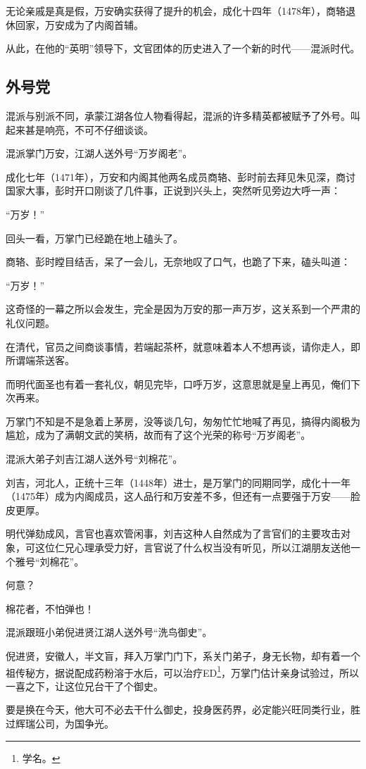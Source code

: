 \begin{multicols}{\theparacolNo}
无论亲戚是真是假，万安确实获得了提升的机会，成化十四年（1478年），商辂退休回家，万安成为了内阁首辅。

从此，在他的“英明”领导下，文官团体的历史进入了一个新的时代——混派时代。

\subsection{外号党}
混派与别派不同，承蒙江湖各位人物看得起，混派的许多精英都被赋予了外号。叫起来甚是响亮，不可不仔细谈谈。

混派掌门万安，江湖人送外号“万岁阁老”。

成化七年（1471年），万安和内阁其他两名成员商辂、彭时前去拜见朱见深，商讨国家大事，彭时开口刚谈了几件事，正说到兴头上，突然听见旁边大呼一声：

“万岁！”

回头一看，万掌门已经跪在地上磕头了。

商辂、彭时瞠目结舌，呆了一会儿，无奈地叹了口气，也跪了下来，磕头叫道：

“万岁！”

这奇怪的一幕之所以会发生，完全是因为万安的那一声万岁，这关系到一个严肃的礼仪问题。

在清代，官员之间商谈事情，若端起茶杯，就意味着本人不想再谈，请你走人，即所谓端茶送客。

而明代面圣也有着一套礼仪，朝见完毕，口呼万岁，这意思就是皇上再见，俺们下次再来。

万掌门不知是不是急着上茅房，没等谈几句，匆匆忙忙地喊了再见，搞得内阁极为尴尬，成为了满朝文武的笑柄，故而有了这个光荣的称号“万岁阁老”。

混派大弟子刘吉江湖人送外号“刘棉花”。

刘吉，河北人，正统十三年（1448年）进士，是万掌门的同期同学，成化十一年（1475年）成为内阁成员，这人品行和万安差不多，但还有一点要强于万安——脸皮更厚。

明代弹劾成风，言官也喜欢管闲事，刘吉这种人自然成为了言官们的主要攻击对象，可这位仁兄心理承受力好，言官说了什么权当没有听见，所以江湖朋友送他一个雅号“刘棉花”。

何意？

棉花者，不怕弹也！

混派跟班小弟倪进贤江湖人送外号“洗鸟御史”。

倪进贤，安徽人，半文盲，拜入万掌门门下，系关门弟子，身无长物，却有着一个祖传秘方，据说配成药粉溶于水后，可以治疗ED\footnote{学名。}，万掌门估计亲身试验过，所以一喜之下，让这位兄台干了个御史。

要是换在今天，他大可不必去干什么御史，投身医药界，必定能兴旺同类行业，胜过辉瑞公司，为国争光。


\end{multicols}
